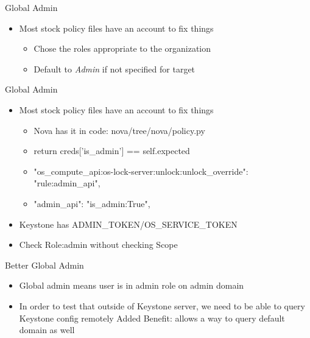 \documentclass{beamer}
\begin{document}
\begin{frame}{Global Admin}
  \begin{itemize}
  \item Most stock policy files have an account to fix things
   \begin{itemize}
    \item Chose the roles appropriate to the organization
    \item Default to \textit{Admin} if not specified for target
    \end{itemize}
  \end{itemize}
\end{frame}
  

\begin{frame}{Global Admin}
  \begin{itemize}
  \item Most stock policy files have an account to fix things
    \begin{itemize}
    \item Nova has it in code: nova/tree/nova/policy.py
    \item return creds['is\_admin'] == self.expected
    \item "os\_compute\_api:os-lock-server:unlock:unlock\_override": "rule:admin\_api",
    \item "admin\_api": "is\_admin:True",
    \end {itemize}
  \item Keystone has  ADMIN\_TOKEN/OS\_SERVICE\_TOKEN
  \item Check Role:admin without checking Scope
  \end{itemize}
\end{frame}


\begin{frame}{Better Global Admin}
  \begin{itemize}
  \item Global admin means user is in admin role on admin domain
  \item In order to test that outside of Keystone server, we need to be able to query Keystone config remotely
Added Benefit: allows a way to query default domain as well
  \end{itemize}
\end{frame}
\end{document}
